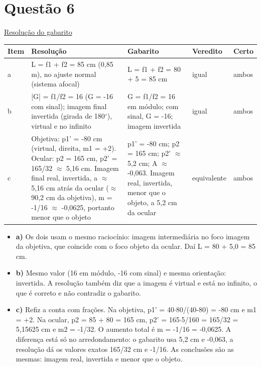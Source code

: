 \documentclass{article}%
\begin{document}
\section*{Questão 6}%
\href{https://poliedroresolve.sistemapoliedro.com.br/vestibulares/ita/2026/ita-2-fase-dia-3-30-10-2025-2-fase-dia-3/dissertativa-6-fisica-2-fase-dia-3-ita-2026}{Resolução do gabarito}\par\smallskip%
\begin{longtable}{@{}p{} p{} p{} p{} p{}@{}}\toprule Item & Resolução & Gabarito & Veredito & Certo \\ \midrule
a & L = f1 + f2 = 85 cm (0,85 m), no ajuste normal (sistema afocal) & L = f1 + f2 = 80 + 5 = 85 cm & igual & ambos \\
b & |G| = f1/f2 = 16 (G = -16 com sinal); imagem final invertida (girada de 180$^\circ$), virtual e no infinito & G = f1/f2 = 16 em módulo; com sinal, G = -16; imagem invertida & igual & ambos \\
c & Objetiva: p1' = -80 cm (virtual, direita, m1 = +2). Ocular: p2 = 165 cm, p2' = 165/32 $\approx$ 5,16 cm. Imagem final real, invertida, a $\approx$ 5,16 cm atrás da ocular ($\approx$ 90,2 cm da objetiva), m = -1/16 $\approx$ -0,0625, portanto menor que o objeto & p1' = -80 cm; p2 = 165 cm; p2' $\approx$ 5,2 cm; A $\approx$ -0,063. Imagem real, invertida, menor que o objeto, a 5,2 cm da ocular & equivalente & ambos \\
\bottomrule\end{longtable}%
\begin{itemize}%
\item%
\textbf{a)} Os dois usam o mesmo raciocínio: imagem intermediária no foco imagem da objetiva, que coincide com o foco objeto da ocular. Daí L = 80 + 5,0 = 85 cm.%
\item%
\textbf{b)} Mesmo valor (16 em módulo, -16 com sinal) e mesma orientação: invertida. A resolução também diz que a imagem é virtual e está no infinito, o que é correto e não contradiz o gabarito.%
\item%
\textbf{c)} Refiz a conta com frações. Na objetiva, p1' = 40$\cdot$80/(40-80) = -80 cm e m1 = +2. Na ocular, p2 = 85 + 80 = 165 cm, p2' = 165$\cdot$5/160 = 165/32 = 5,15625 cm e m2 = -1/32. O aumento total é m = -1/16 = -0,0625. A diferença está só no arredondamento: o gabarito usa 5,2 cm e -0,063, a resolução dá os valores exatos 165/32 cm e -1/16. As conclusões são as mesmas: imagem real, invertida e menor que o objeto.%
\end{itemize}%
\end{document}

